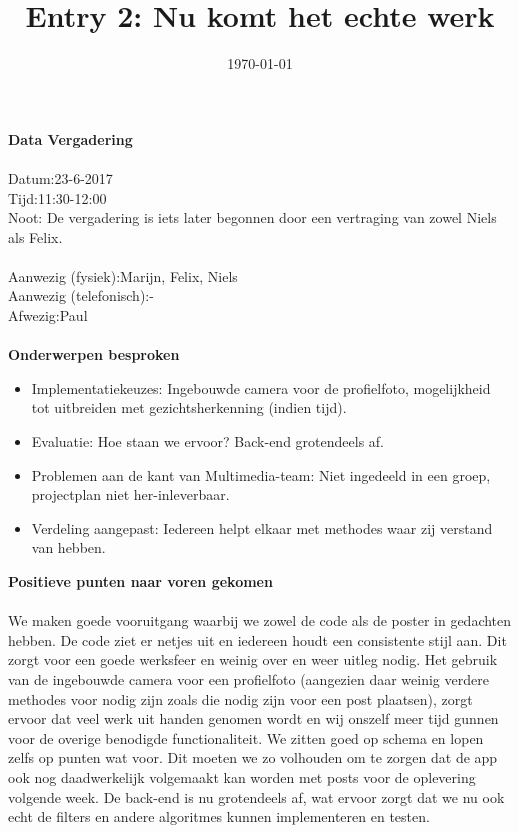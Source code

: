 \documentclass{uva-inf-article}
\title{Entry 2: Nu komt het echte werk}
\date{\today}
\newcommand\tab[1][1cm]{\hspace*{#1}}
\newcommand\tabb[1][1.4cm]{\hspace*{#1}}
\begin{document}
\maketitle

\noindent
\textbf{Data Vergadering}\\\\
Datum:\tab 23-6-2017
\\
Tijd:\tabb 11:30-12:00
\\
Noot: De vergadering is iets later begonnen door een vertraging van zowel Niels als Felix.
\\\\
\noindent
Aanwezig (fysiek):\tabb\space\space\space Marijn, Felix, Niels\\
Aanwezig (telefonisch):\tab-\\
Afwezig:\tabb\tabb\space\space\space\space Paul\\\\
\noindent
\textbf{Onderwerpen besproken}

\begin{itemize}
\item Implementatiekeuzes:		Ingebouwde camera voor de profielfoto, mogelijkheid tot uitbreiden met gezichtsherkenning (indien tijd).
\item Evaluatie:		Hoe staan we ervoor? Back-end grotendeels af.
\item Problemen aan de kant van Multimedia-team: 	Niet ingedeeld in een groep, projectplan niet her-inleverbaar.
\item Verdeling aangepast:		Iedereen helpt elkaar met methodes waar zij verstand van hebben.
\end{itemize}
\pagebreak

\noindent
\textbf{Positieve punten naar voren gekomen}\\\\
We maken goede vooruitgang waarbij we zowel de code als de poster in gedachten hebben. De code ziet er netjes uit en iedereen houdt een consistente stijl aan. Dit zorgt voor een goede werksfeer en weinig over en weer uitleg nodig.
Het gebruik van de ingebouwde camera voor een profielfoto (aangezien daar weinig verdere methodes voor nodig zijn zoals die nodig zijn voor een post plaatsen), zorgt ervoor dat veel werk uit handen genomen wordt en wij onszelf meer tijd gunnen voor de overige benodigde functionaliteit. We zitten goed op schema en lopen zelfs op punten wat voor. Dit moeten we zo volhouden om te zorgen dat de app ook nog daadwerkelijk volgemaakt kan worden met posts voor de oplevering volgende week.
De back-end is nu grotendeels af, wat ervoor zorgt dat we nu ook echt de filters en andere algoritmes kunnen implementeren en testen.
\\\\
\end{document}
